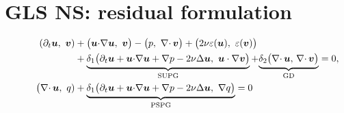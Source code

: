 \documentclass[onefignum,onetabnum]{siamart190516}
\begin{document}




\section{GLS NS: residual formulation}

\begin{equation}
  \begin{aligned}
    \left( \partial_t {\boldsymbol u} ,\  {\boldsymbol v} \right) 
    &+ \big( {\boldsymbol u} {\cdot} \nabla {\boldsymbol u},\ {\boldsymbol v} \big)
    - \big( p,\ \nabla{\cdot\,} {\boldsymbol v} \big) + 
    \big( 2 \nu \varepsilon({\boldsymbol u}),\ \varepsilon({\boldsymbol v}) \big) \\
    & 
    +  
    \underbrace{\delta_1 \big( \partial_t {\boldsymbol u} + {\boldsymbol u} {\cdot} \nabla {\boldsymbol u} + \nabla p - 2 \nu \Delta {\boldsymbol u},\ {\boldsymbol u} \cdot \nabla {\boldsymbol v} \big)}_{\text{SUPG}}  +
    {\underbrace{\delta_2 \big(\nabla{\cdot\,} {\boldsymbol u}, \, \nabla{\cdot\,} {\boldsymbol v} \big)}_{\text{GD}}}
    =0, \\
    \hspace{2.2em} 
    \big( \nabla{\cdot\,} {\boldsymbol u},\ q)&
    + \underbrace{\delta_1 \big( \partial_t {\boldsymbol u} + {\boldsymbol u} {\cdot} \nabla {\boldsymbol u} + \nabla p - 2 \nu \Delta {\boldsymbol u},\ \nabla q \big)}_{\text{PSPG}} = 0 
  \end{aligned}
\end{equation}
\end{document}
